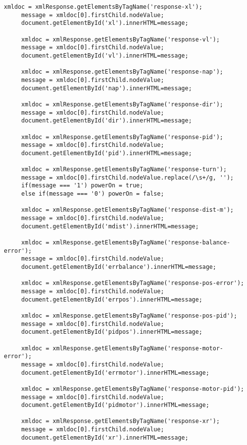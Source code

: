 \documentclass[a4paper,12pt,twoside,openany]{report}
\begin{document}
\begin{lstlisting}[style=customhtml]
     xmldoc = xmlResponse.getElementsByTagName('response-xl');
     message = xmldoc[0].firstChild.nodeValue;
     document.getElementById('xl').innerHTML=message;

     xmldoc = xmlResponse.getElementsByTagName('response-vl');
     message = xmldoc[0].firstChild.nodeValue;
     document.getElementById('vl').innerHTML=message;

     xmldoc = xmlResponse.getElementsByTagName('response-nap');
     message = xmldoc[0].firstChild.nodeValue;
     document.getElementById('nap').innerHTML=message;

     xmldoc = xmlResponse.getElementsByTagName('response-dir');
     message = xmldoc[0].firstChild.nodeValue;
     document.getElementById('dir').innerHTML=message;

     xmldoc = xmlResponse.getElementsByTagName('response-pid');
     message = xmldoc[0].firstChild.nodeValue;
     document.getElementById('pid').innerHTML=message;

     xmldoc = xmlResponse.getElementsByTagName('response-turn');
     message = xmldoc[0].firstChild.nodeValue.replace(/\s+/g, '');
     if(message === '1') powerOn = true;
     else if(message === '0') powerOn = false;

     xmldoc = xmlResponse.getElementsByTagName('response-dist-m');
     message = xmldoc[0].firstChild.nodeValue;
     document.getElementById('mdist').innerHTML=message;

     xmldoc = xmlResponse.getElementsByTagName('response-balance-error');
     message = xmldoc[0].firstChild.nodeValue;
     document.getElementById('errbalance').innerHTML=message;

     xmldoc = xmlResponse.getElementsByTagName('response-pos-error');
     message = xmldoc[0].firstChild.nodeValue;
     document.getElementById('errpos').innerHTML=message;

     xmldoc = xmlResponse.getElementsByTagName('response-pos-pid');
     message = xmldoc[0].firstChild.nodeValue;
     document.getElementById('pidpos').innerHTML=message;

     xmldoc = xmlResponse.getElementsByTagName('response-motor-error');
     message = xmldoc[0].firstChild.nodeValue;
     document.getElementById('errmotor').innerHTML=message;

     xmldoc = xmlResponse.getElementsByTagName('response-motor-pid');
     message = xmldoc[0].firstChild.nodeValue;
     document.getElementById('pidmotor').innerHTML=message;

     xmldoc = xmlResponse.getElementsByTagName('response-xr');
     message = xmldoc[0].firstChild.nodeValue;
     document.getElementById('xr').innerHTML=message;


\end{lstlisting}
\end{document}
